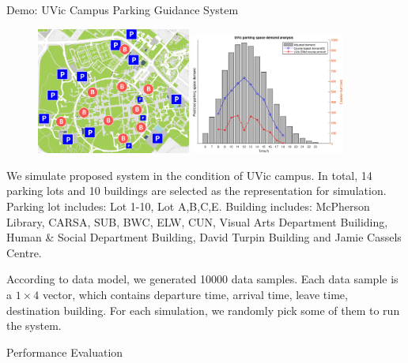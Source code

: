 \documentclass[final, xcolor={table,dvipsnames},t]{beamer}
\newlength{\colwidth}
\begin{document}
\begin{frame}[t]
\begin{columns}[t]
\begin{column}{\colwidth}
\begin{exampleblock}{Demo: UVic Campus Parking Guidance System}
\begin{figure}[h]
    \centering
    \includegraphics[width=0.45\textwidth]{CampusMap.png} 
    \hfill 
    \includegraphics[width=0.45\textwidth]{dataset.eps}
    \label{performance} 
\end{figure}
    We simulate proposed system in the condition of UVic campus. In total, 14 parking lots and 10 buildings are selected as the representation for simulation. \\
    Parking lot includes: Lot 1-10, Lot A,B,C,E. Building includes: McPherson Library, CARSA, SUB, BWC, ELW, CUN, Visual Arts Department Builiding, Human & Social Department Building, David Turpin Building and Jamie Cassels Centre.

    According to data model, we generated 10000 data samples. Each data sample is a $1\times4$ vector, which contains departure time, arrival time, leave time, destination building. For each simulation, we randomly pick some of them to run the system.
  \end{exampleblock}

  \begin{block}{Performance Evaluation}


\end{block}
\end{column}
\end{columns}
\end{frame}
\end{document}
